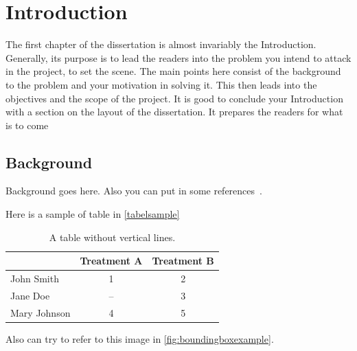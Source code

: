 
\chapter{Introduction}
\begin{spacing}{1.5}
\setlength{\parskip}{0.3in}

The first chapter of the dissertation is almost invariably the Introduction. Generally, its purpose is to lead the readers into the problem you intend to attack in the project, to set the scene. The main points here consist of the background to the problem and your motivation in solving it. This then leads into the objectives and the scope of the project. It is good to conclude your Introduction with a section on the layout of the dissertation. It prepares the readers for what is to come

\section{Background}


Background goes here. Also you can put in some references~\cite{ronneberger2015unet}.

Here is a sample of table in \autoref{tabelsample}

\begin{table}[ht]
\centering
\caption{A table without vertical lines.}
\label{tabelsample}
\begin{tabular}[t]{lcc}
\hline
&Treatment A&Treatment B\\
\hline
John Smith&1&2\\
Jane Doe&--&3\\
Mary Johnson&4&5\\
\hline
\end{tabular}
\end{table}%

Also can try to refer to this image in \autoref{fig:boundingboxexample}.



\end{spacing}
